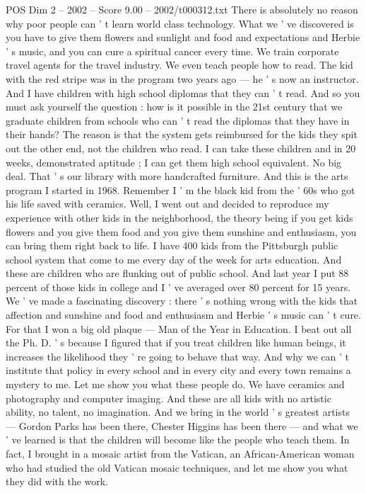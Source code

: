 \begin{textsample}{POS Dim 2 – 2002 – Score 9.00 – 2002/t000312.txt}
There is absolutely no reason why poor people can ' t learn world class technology.
What we ' ve discovered is you have to give them flowers and sunlight and food and expectations and Herbie ' s music, and you can cure a spiritual cancer every time.
We train corporate travel agents for the travel industry.
We even teach people how to read.
The kid with the red stripe was in the program two years ago — he ' s now an instructor.
And I have children with high school diplomas that they can ' t read.
And so you must ask yourself the question : how is it possible in the 21st century that we graduate children from schools who can ' t read the diplomas that they have in their hands?
The reason is that the system gets reimbursed for the kids they spit out the other end, not the children who read.
I can take these children and in 20 weeks, demonstrated aptitude ; I can get them high school equivalent.
No big deal.
That ' s our library with more handcrafted furniture.
And this is the arts program I started in 1968.
Remember I ' m the black kid from the ' 60s who got his life saved with ceramics.
Well, I went out and decided to reproduce my experience with other kids in the neighborhood, the theory being if you get kids flowers and you give them food and you give them sunshine and enthusiasm, you can bring them right back to life.
I have 400 kids from the Pittsburgh public school system that come to me every day of the week for arts education.
And these are children who are flunking out of public school.
And last year I put 88 percent of those kids in college and I ' ve averaged over 80 percent for 15 years.
We ' ve made a fascinating discovery : there ' s nothing wrong with the kids that affection and sunshine and food and enthusiasm and Herbie ' s music can ' t cure.
For that I won a big old plaque — Man of the Year in Education.
I beat out all the Ph.
D. ' s because I figured that if you treat children like human beings, it increases the likelihood they ' re going to behave that way.
And why we can ' t institute that policy in every school and in every city and every town remains a mystery to me.
Let me show you what these people do.
We have ceramics and photography and computer imaging.
And these are all kids with no artistic ability, no talent, no imagination.
And we bring in the world ' s greatest artists — Gordon Parks has been there, Chester Higgins has been there — and what we ' ve learned is that the children will become like the people who teach them.
In fact, I brought in a mosaic artist from the Vatican, an African-American woman who had studied the old Vatican mosaic techniques, and let me show you what they did with the work.

\end{textsample}
